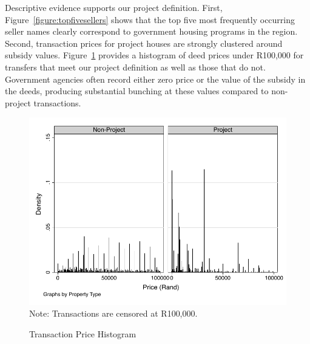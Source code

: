 \documentclass[12pt]{article}
\begin{document}
Descriptive evidence supports our project definition.  First, Figure~\ref{figure:topfivesellers} shows that the top five most frequently occurring seller names clearly correspond to government housing programs in the region.  Second, transaction prices for project houses are strongly clustered around subsidy values.  Figure~\ref{figure:transactionhist} provides a histogram of deed prices under R100,000 for transfers that meet our project definition as well as those that do not.  Government agencies often record either zero price or the value of the subsidy in the deeds, producing substantial bunching at these values compared to non-project transactions.  


\begin{figure}
\caption{Transaction Price Histogram}\label{figure:transactionhist}
\centering
\includegraphics[scale=1]{figures/price_histogram.pdf}\\
Note: Transactions are censored at R100,000.
\end{figure}
\end{document}
